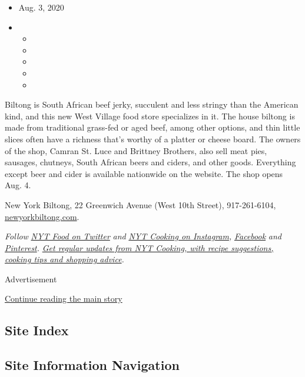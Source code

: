 \begin{itemize}
\item
  Aug. 3, 2020
\item
  \begin{itemize}
  \item
  \item
  \item
  \item
  \item
  \end{itemize}
\end{itemize}

Biltong is South African beef jerky, succulent and less stringy than the
American kind, and this new West Village food store specializes in it.
The house biltong is made from traditional grass-fed or aged beef, among
other options, and thin little slices often have a richness that's
worthy of a platter or cheese board. The owners of the shop, Camran St.
Luce and Brittney Brothers, also sell meat pies, sausages, chutneys,
South African beers and ciders, and other goods. Everything except beer
and cider is available nationwide on the website. The shop opens Aug. 4.

New York Biltong, 22 Greenwich Avenue (West 10th Street), 917-261-6104,
\href{https://newyorkbiltong.com/}{newyorkbiltong.com}.

\emph{Follow} \href{https://twitter.com/nytfood}{\emph{NYT Food on
Twitter}} \emph{and}
\href{https://www.instagram.com/nytcooking/}{\emph{NYT Cooking on
Instagram}}\emph{,}
\href{https://www.facebookcorewwwi.onion/nytcooking/}{\emph{Facebook}}
\emph{and}
\href{https://www.pinterest.com/nytcooking/}{\emph{Pinterest}}\emph{.}
\href{https://www.nytimes3xbfgragh.onion/newsletters/cooking}{\emph{Get
regular updates from NYT Cooking, with recipe suggestions, cooking tips
and shopping advice}}\emph{.}

Advertisement

\protect\hyperlink{after-bottom}{Continue reading the main story}

\hypertarget{site-index}{%
\subsection{Site Index}\label{site-index}}

\hypertarget{site-information-navigation}{%
\subsection{Site Information
Navigation}\label{site-information-navigation}}

